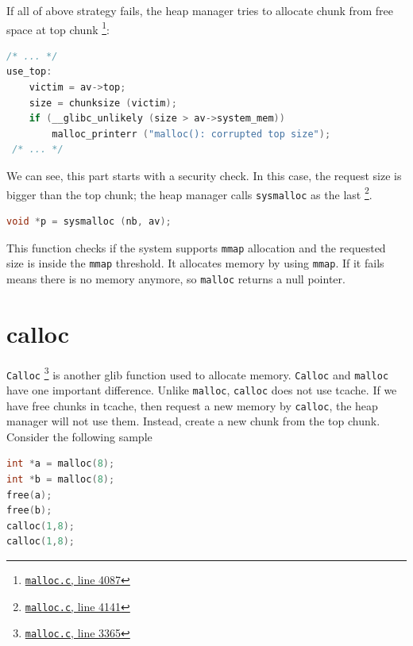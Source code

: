 \documentclass{masterthesis}
\newcommand*\tch{tcache}
\newcommand*\mallocc{\lstinline{malloc}}
\newcommand*\callocc{\lstinline{calloc}}
\newcommand*\mmapc{\lstinline{mmap}}
\newcommand*\Callocc{\lstinline{Calloc}\xspace}
\begin{document}
If all of above strategy fails, the heap manager tries to allocate chunk from free space at top chunk \footnote{\href{https://sourceware.org/git/?p=glibc.git;a=blob;f=malloc/malloc.c;h=f7cd29bc2f93e1082ee77800bd64a4b2a2897055;hb=9ea3686266dca3f004ba874745a4087a89682617\#l4087}{\texttt{malloc.c}, line 4087}}:

\begin{lstlisting}[language=c,frame=tlrb]
 /* ... */
use_top:
	victim = av->top;
	size = chunksize (victim);
	if (__glibc_unlikely (size > av->system_mem))
		malloc_printerr ("malloc(): corrupted top size");
 /* ... */
\end{lstlisting}

We can see, this part starts with a security check. In this case, the request size is bigger than the top chunk; the heap manager calls \lstinline{sysmalloc} as the last \footnote{\href{https://sourceware.org/git/?p=glibc.git;a=blob;f=malloc/malloc.c;h=f7cd29bc2f93e1082ee77800bd64a4b2a2897055;hb=9ea3686266dca3f004ba874745a4087a89682617\#l4141}{\texttt{malloc.c}, line 4141}}.

\begin{lstlisting}[language=c,frame=tlrb]
 void *p = sysmalloc (nb, av);
 \end{lstlisting}

This function checks if the system supports \mmapc{} allocation and the requested size is inside the \mmapc{} threshold. It allocates memory by using \mmapc{}. If it fails means there is no memory anymore, so \mallocc{} returns a null pointer.

\section{calloc}
\Callocc{} \footnote{\href{https://sourceware.org/git/?p=glibc.git;a=blob;f=malloc/malloc.c;h=f7cd29bc2f93e1082ee77800bd64a4b2a2897055;hb=9ea3686266dca3f004ba874745a4087a89682617\#l3365}{\texttt{malloc.c}, line 3365}} is another glib function used to allocate memory. \Callocc{} and \mallocc{} have one important difference. Unlike \mallocc{}, \callocc{} does not use \tch{}. If we have free chunks in \tch{}, then request a new memory by \callocc{}, the heap manager will not use them. Instead, create a new chunk from the top chunk. Consider the following sample

\begin{lstlisting}[language=c,frame=tlrb]
int *a = malloc(8);
int *b = malloc(8);
free(a);
free(b);
calloc(1,8);
calloc(1,8);
\end{lstlisting}
\end{document}
